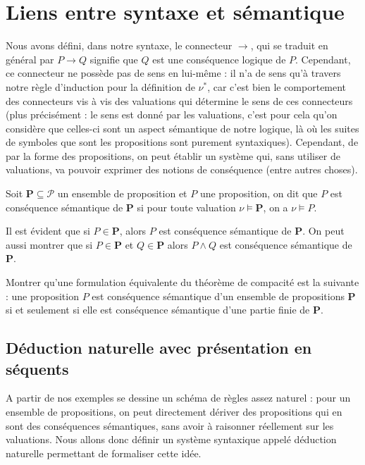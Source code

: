 \section{Liens entre syntaxe et sémantique}

Nous avons défini, dans notre syntaxe, le connecteur $\to$, qui se traduit en général par \og $P\to Q$ signifie que $Q$ est une conséquence logique de $P$\fg{}. Cependant, ce connecteur ne possède pas de sens en lui-même : il n'a de sens qu'à travers notre règle d'induction pour la définition de $\nu^*$, car c'est bien le comportement des connecteurs vis à vis des valuations qui détermine le sens de ces connecteurs (plus précisément : le sens est donné par les valuations, c'est pour cela qu'on considère que celles-ci sont un aspect sémantique de notre logique, là où les suites de symboles que sont les propositions sont purement syntaxiques). Cependant, de par la forme des propositions, on peut établir un système qui, sans utiliser de valuations, va pouvoir exprimer des notions de conséquence (entre autres choses).

\begin{defi}
    Soit $\mathbf P\subseteq\mathcal P$ un ensemble de proposition et $P$ une proposition, on dit que $P$ est conséquence sémantique de $\mathbf P$ si pour toute valuation $\nu\models\mathbf P$, on a $\nu\models P$. 
\end{defi}

\begin{expl}
    Il est évident que si $P\in\mathbf P$, alors $P$ est conséquence sémantique de $\mathbf P$. On peut aussi montrer que si $P\in\mathbf P$ et $Q\in\mathbf P$ alors $P\land Q$ est conséquence sémantique de $\mathbf P$.
\end{expl}

\begin{exo}
    Montrer qu'une formulation équivalente du théorème de compacité est la suivante : une proposition $P$ est conséquence sémantique d'un ensemble de propositions $\mathbf P$ si et seulement si elle est conséquence sémantique d'une partie finie de $\mathbf P$.
\end{exo}

\subsection{Déduction naturelle avec présentation en séquents}

A partir de nos exemples se dessine un schéma de règles assez naturel : pour un ensemble de propositions, on peut directement dériver des propositions qui en sont des conséquences sémantiques, sans avoir à raisonner réellement sur les valuations. Nous allons donc définir un système syntaxique appelé déduction naturelle permettant de formaliser cette idée.

